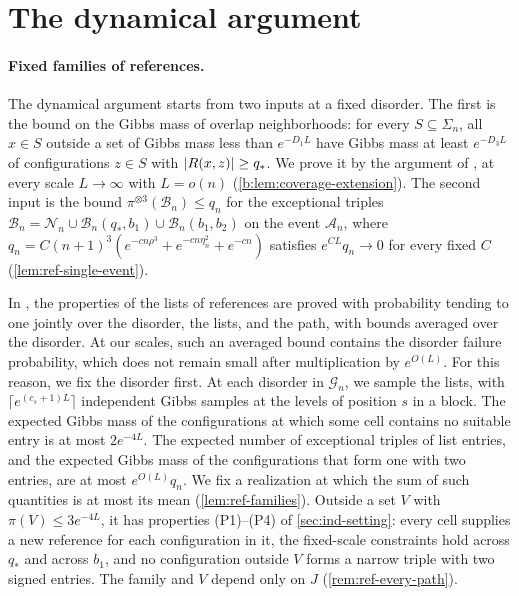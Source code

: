 \section{The dynamical argument}\label{sec:ov-dynamics}

\paragraph{Fixed families of references.} The dynamical argument starts from
two inputs at a fixed disorder. The first is the bound on the Gibbs mass of
overlap neighborhoods: for every $S\subseteq\Sigma_n$, all $x\in S$ outside a
set of Gibbs mass less than $e^{-D_1L}$ have Gibbs mass at least $e^{-D_3L}$ of
configurations $z\in S$ with $\lvert R(x,z)\rvert\ge q_*$. We prove it by the argument
of \cite[Proposition~6.1]{oai-barriers}, at every scale $L\to\infty$ with
$L=o(n)$ (\cref{b:lem:coverage-extension}). The second input is the bound
$\pi^{\otimes3}(\mathcal B_n)\le q_n$ for the exceptional triples
$\mathcal B_n=\mathcal N_n\cup\mathcal B_n(q_*,b_1)\cup\mathcal B_n(b_1,b_2)$ on
the event $\mathcal A_n$, where
$q_n=C(n+1)^3(e^{-cn\rho^3}+e^{-cn\eta_n^2}+e^{-cn})$ satisfies
$e^{CL}q_n\to0$ for every fixed $C$ (\cref{lem:ref-single-event}).

In \cite[Section~8.3]{oai-barriers}, the properties of the lists of references
are proved with probability tending to one jointly over the disorder, the
lists, and the path, with bounds averaged over the disorder. At our scales,
such an averaged bound contains the disorder failure probability, which does
not remain small after multiplication by $e^{O(L)}$. For this reason, we fix
the disorder first. At each
disorder in $\mathcal G_n$, we sample the lists, with
$\lceil e^{(c_s+1)L}\rceil$ independent Gibbs samples at the levels of
position $s$ in a block. The expected Gibbs mass of the configurations at which
some cell contains no suitable entry is at most $2e^{-4L}$. The expected number
of exceptional triples of list entries, and the expected Gibbs mass of the
configurations that form one with two entries, are at most $e^{O(L)}q_n$. We fix
a realization at which the sum of such quantities is at most its mean
(\cref{lem:ref-families}). Outside a set $V$ with $\pi(V)\le3e^{-4L}$, it has
properties (P1)--(P4) of \cref{sec:ind-setting}: every cell supplies a new
reference for each configuration in it, the fixed-scale constraints hold across $q_*$ and across $b_1$, and
no configuration outside $V$ forms a narrow triple with two signed entries.
The family and $V$ depend only on $J$ (\cref{rem:ref-every-path}).


